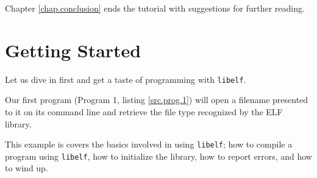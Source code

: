 \documentclass[a4paper]{report}
\newcommand{\library}[1]{\texttt{#1}}
\begin{document}
Chapter \vref{chap.conclusion} ends the tutorial with suggestions for
further reading.

\chapter{Getting Started}\label{chap.getting-started}

Let us dive in first and get a taste of programming with
\library{libelf}.

Our first program (Program 1, listing \vref{src.prog.1}) will open a
filename presented to it on its command line and retrieve the file
type recognized by the ELF library.

This example is covers the basics involved in using \library{libelf};
how to compile a program using \library{libelf}, how to initialize the
library, how to report errors, and how to wind up.


\end{document}
